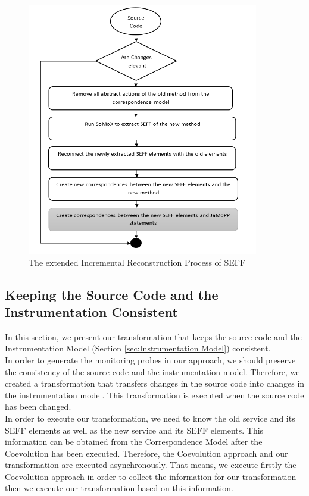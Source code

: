\begin{figure}[h]
\centering
\includegraphics[width=0.9\textwidth]{figures/seff_reconst_extension}
\caption{The extended Incremental Reconstruction Process of SEFF}
\label{fig:seff_reconst_extension}
\end{figure}


\subsection{Keeping the Source Code and the Instrumentation Consistent}
\label{sec:Keeping the Source Code and the Instrumentation Consistent}
In this section, we present our transformation that keeps the source code and the Instrumentation Model (Section \ref{sec:Instrumentation Model}) consistent.\\

In order to generate the monitoring probes in our approach, we should preserve the consistency of the source code and the instrumentation model. Therefore, we created a transformation that transfers changes in the source code into changes in the instrumentation model. This transformation is executed when the source code has been changed.\\

In order to execute our transformation, we need to know the old service and its SEFF elements as well as the new service and its SEFF elements. This information can be obtained from the Correspondence Model after the Coevolution has been executed. Therefore, the Coevolution approach and our transformation are executed asynchronously. That means, we execute firstly the Coevolution approach in order to collect the information for our transformation then we execute our transformation based on this information.\\

